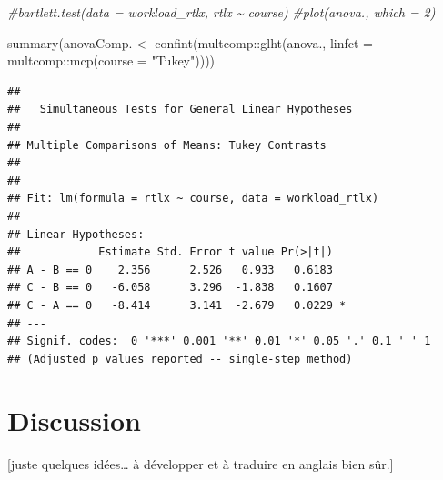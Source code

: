 \documentclass[
]{article}
\newenvironment{Shaded}{\begin{snugshade}}{\end{snugshade}}
\newcommand{\AttributeTok}[1]{\textcolor[rgb]{0.77,0.63,0.00}{#1}}
\newcommand{\CommentTok}[1]{\textcolor[rgb]{0.56,0.35,0.01}{\textit{#1}}}
\newcommand{\FunctionTok}[1]{\textcolor[rgb]{0.00,0.00,0.00}{#1}}
\newcommand{\NormalTok}[1]{#1}
\newcommand{\OtherTok}[1]{\textcolor[rgb]{0.56,0.35,0.01}{#1}}
\newcommand{\SpecialCharTok}[1]{\textcolor[rgb]{0.00,0.00,0.00}{#1}}
\newcommand{\StringTok}[1]{\textcolor[rgb]{0.31,0.60,0.02}{#1}}
\begin{document}
\begin{Shaded}
\begin{Highlighting}[]
\CommentTok{\#bartlett.test(data = workload\_rtlx, rtlx \textasciitilde{} course)}
\CommentTok{\#plot(anova., which = 2)}

\FunctionTok{summary}\NormalTok{(anovaComp. }\OtherTok{\textless{}{-}} \FunctionTok{confint}\NormalTok{(multcomp}\SpecialCharTok{::}\FunctionTok{glht}\NormalTok{(anova.,}
  \AttributeTok{linfct =}\NormalTok{ multcomp}\SpecialCharTok{::}\FunctionTok{mcp}\NormalTok{(}\AttributeTok{course =} \StringTok{"Tukey"}\NormalTok{))))}
\end{Highlighting}
\end{Shaded}

\begin{verbatim}
## 
##   Simultaneous Tests for General Linear Hypotheses
## 
## Multiple Comparisons of Means: Tukey Contrasts
## 
## 
## Fit: lm(formula = rtlx ~ course, data = workload_rtlx)
## 
## Linear Hypotheses:
##            Estimate Std. Error t value Pr(>|t|)  
## A - B == 0    2.356      2.526   0.933   0.6183  
## C - B == 0   -6.058      3.296  -1.838   0.1607  
## C - A == 0   -8.414      3.141  -2.679   0.0229 *
## ---
## Signif. codes:  0 '***' 0.001 '**' 0.01 '*' 0.05 '.' 0.1 ' ' 1
## (Adjusted p values reported -- single-step method)
\end{verbatim}

\hypertarget{discussion}{%
\section{Discussion}\label{discussion}}

{[}juste quelques idées\ldots{} à développer et à traduire en anglais
bien sûr.{]}
\end{document}
